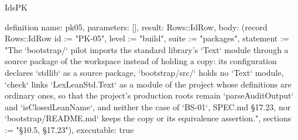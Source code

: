 \begin{lexlean}{IdsPK}
\begin{semanticmodule}
definition{
  name: pk05,
  parameters: [],
  result: Rows::IdRow,
  body: (record Rows::IdRow {id := "PK-05", level := "build", suite := "packages", statement := "The `bootstrap/` pilot imports the standard library's `Text` module through a source package of the workspace instead of holding a copy: its configuration declares `stdlib` as a source package, `bootstrap/src/` holds no `Text` module, `check` links `LexLeanStd.Text` as a module of the project whose definitions are ordinary ones, so that the project's production roots remain `parseAuditOutput` and `isClosedLeanName`, and neither the case of `BS-01`, SPEC.md §17.23, nor `bootstrap/README.md` keeps the copy or its equivalence assertion.", sections := "§10.5, §17.23"}),
  executable: true
}
\end{semanticmodule}
\end{lexlean}
